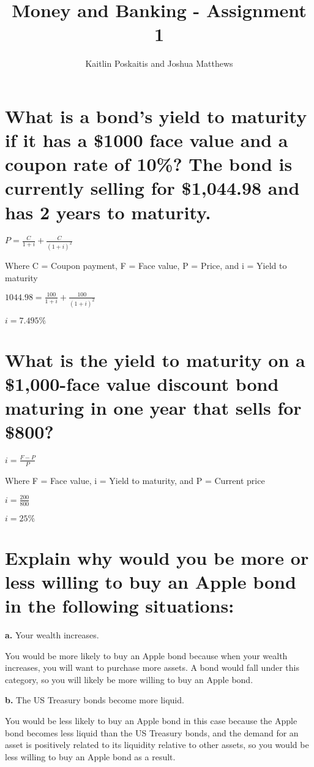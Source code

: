 \documentclass[12pt]{article}
\title{\bf Money and Banking - Assignment 1}
\author{Kaitlin Poskaitis and Joshua Matthews}
\date{}
\begin{document}
\maketitle

\section{What is a bond's yield to maturity if it has a \$1000 face value and a
coupon rate of 10\%? The bond is currently selling for \$1,044.98 and has 2 
years to maturity.}

\indent $P = \frac{C}{1+i} + \frac{C}{(1+i)^2}$

Where C = Coupon payment, F = Face value, P = Price, and i = Yield to maturity

\indent $1044.98 = \frac{100}{1 + i} + \frac{100}{(1 + i)^2}$

\indent $i = 7.495\%$


\section{What is the yield to maturity on a \$1,000-face value discount bond
maturing in one year that sells for \$800?}

\indent $i = \frac{F - P}{P}$

Where F = Face value, i = Yield to maturity, and P = Current price

\indent $i = \frac{200}{800}$

\indent $i = 25\%$


\section{Explain why would you be more or less willing to buy an Apple bond in
the following situations:}

{\bf a.} Your wealth increases.

You would be more likely to buy an Apple bond because when your wealth 
increases, you will want to purchase more assets. A bond would fall under this 
category, so you will likely be more willing to buy an Apple bond.

{\bf b.} The US Treasury bonds become more liquid.

You would be less likely to buy an Apple bond in this case because the Apple
bond becomes less liquid than the US Treasury bonds, and the demand for an 
asset is positively related to its liquidity relative to other assets, so
you would be less willing to buy an Apple bond as a result.
\end{document}
